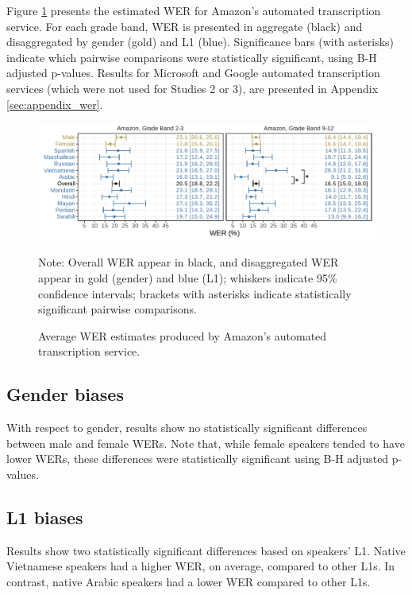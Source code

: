 \documentclass [PhD] {uclathes}
\begin{document}
Figure \ref{wer_aws} presents the estimated WER for Amazon’s automated transcription service. For each grade band, WER is presented in aggregate (black) and disaggregated by gender (gold) and L1 (blue). Significance bars (with asterisks) indicate which pairwise comparisons were statistically significant, using B-H adjusted p-values. Results for Microsoft and Google automated transcription services (which were not used for Studies 2 or 3), are presented in Appendix \ref{sec:appendix_wer}. 

\begin{figure}[h]
    \centering
    \caption{Average WER estimates produced by Amazon’s automated transcription service.}
    \includegraphics[width=6.5in]{figures/20230513_adj_werPlot_sigBars_aws.pdf}
    \label{wer_aws}
{Note: Overall WER appear in black, and disaggregated WER appear in gold (gender) and blue (L1); whiskers indicate 95\% confidence intervals; brackets with asterisks indicate statistically significant pairwise comparisons. \par}
\end{figure}


\subsection{Gender biases}

With respect to gender, results show no statistically significant differences between male and female WERs. Note that, while female speakers tended to have lower WERs, these differences were statistically significant using B-H adjusted p-values.

\subsection{L1 biases}

Results show two statistically significant differences based on speakers’ L1. Native Vietnamese speakers had a higher WER, on average, compared to other L1s. In contrast, native Arabic speakers had a lower WER compared to other L1s. 
\end{document}
